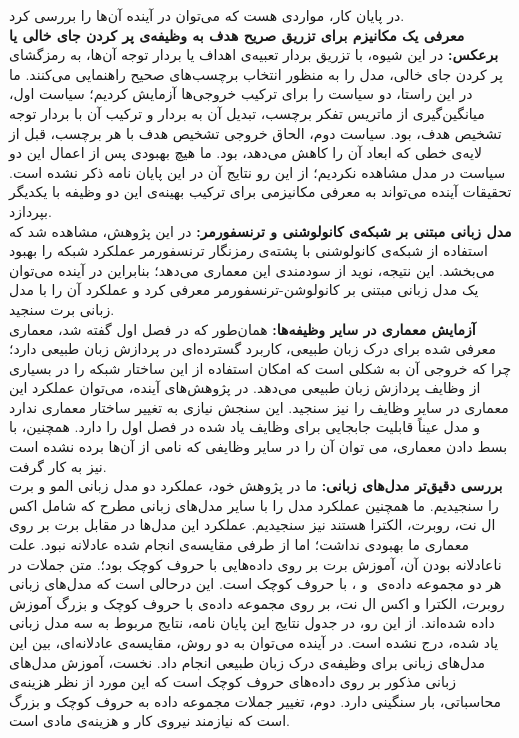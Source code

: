 در پایان کار، مواردی هست که می‌توان در آینده آن‌ها را بررسی کرد.\\
\textbf {معرفی یک مکانیزم برای تزریق صریح هدف به وظیفه‌ی پر کردن جای خالی یا برعکس:} 
در این شیوه، با تزریق بردار تعبیه‌ی اهداف یا بردار توجه آن‌ها، به رمزگشای پر کردن جای خالی، مدل را به منظور انتخاب برچسب‌های صحیح راهنمایی می‌کنند. ما در این راستا، دو سیاست را برای ترکیب خروجی‌ها آزمایش کردیم؛ سیاست اول، میانگین‌گیری از ماتریس تفکر برچسب، تبدیل آن به بردار و ترکیب آن با بردار توجه تشخیص هدف، بود. سیاست دوم، الحاق خروجی تشخیص هدف با هر برچسب، قبل از لایه‌ی خطی که ابعاد آن را کاهش می‌دهد، بود. ما هیچ بهبودی پس از اعمال این دو سیاست در مدل مشاهده نکردیم؛ از این رو نتایج آن در این پایان نامه ذکر نشده است. تحقیقات آینده می‌تواند به معرفی مکانیزمی برای ترکیب بهینه‌ی این دو وظیفه با یکدیگر بپردازد.\\
\textbf {مدل زبانی مبتنی بر شبکه‌ی کانولوشنی و ترنسفورمر:}
در این پژوهش، مشاهده شد که استفاده از شبکه‌ی کانولوشنی با پشته‌ی رمزنگار ترنسفورمر عملکرد شبکه را بهبود می‌بخشد. این نتیجه، نوید از سودمندی این معماری می‌دهد؛ بنابراین در آینده می‌توان یک مدل زبانی مبتنی بر کانولوشن-ترنسفورمر معرفی کرد و عملکرد آن را با مدل زبانی برت سنجید.\\
\textbf {آزمایش معماری در سایر وظیفه‌ها:} 
همان‌طور که در فصل اول گفته شد، معماری معرفی شده برای درک زبان طبیعی، کاربرد گسترده‌ای در پردازش زبان طبیعی دارد؛ چرا که خروجی آن به شکلی است که امکان استفاده از این ساختار شبکه را در بسیاری از وظایف پردازش زبان طبیعی می‌دهد. در پژوهش‌های آینده، می‌توان عملکرد این معماری در سایر وظایف را نیز سنجید. این سنجش نیازی به تغییر ساختار معماری ندارد و مدل عیناً قابلیت جابجایی برای وظایف یاد شده در فصل اول را دارد. همچنین، با بسط دادن معماری، می توان آن را در سایر وظایفی که نامی از آن‌ها برده نشده است نیز به کار گرفت.\\
\textbf {بررسی دقیق‌تر مدل‌های زبانی:} 
ما در پژوهش خود، عملکرد دو مدل زبانی المو و برت را سنجیدیم. ما همچنین عملکرد مدل را با سایر مدل‌های زبانی مطرح که شامل اکس ال نت، روبرت، الکترا هستند نیز سنجیدیم. عملکرد این مدل‌ها در مقابل برت بر روی معماری ما بهبودی نداشت؛ اما از طرفی مقایسه‌ی انجام شده عادلانه نبود. علت ناعادلانه بودن آن، آموزش برت بر روی داده‌هایی با حروف کوچک بود؛. متن جملات در هر دو مجموعه داده‌ی ‌ و ، با حروف کوچک است. این درحالی است که مدل‌های زبانی روبرت، الکترا و اکس ال نت، بر روی مجموعه داده‌ی با حروف کوچک و بزرگ آموزش داده شده‌اند. از این رو، در جدول نتایج این پایان نامه، نتایج مربوط به سه مدل زبانی یاد شده، درج نشده است. در آینده می‌توان به دو روش، مقایسه‌ی عادلانه‌ای، بین این مدل‌های زبانی برای وظیفه‌ی درک زبان طبیعی انجام داد. نخست، آموزش مدل‌های زبانی مذکور بر روی داده‌های حروف کوچک است که این مورد از نظر هزینه‌ی محاسباتی، بار سنگینی دارد. دوم، تغییر جملات مجموعه داده به حروف کوچک و بزرگ است که نیازمند نیروی کار و هزینه‌ی مادی است.